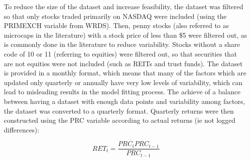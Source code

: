 \documentclass[a4paper, table]{article}
\begin{document}

To reduce the size of the dataset and increase feasibility, the dataset was filtered so that only stocks traded primarily on NASDAQ were included (using the PRIMEXCH variable from WRDS). Then, penny stocks (also referred to as microcaps in the literature) with a stock price of less than \$5 were filtered out, as is commonly done in the literature to reduce variability. Stocks without a share code of 10 or 11 (referring to equities) were filtered out, so that securities that are not equities were not included (such as REITs and trust funds). The dataset is provided in a monthly format, which means that many of the factors which are updated only quarterly or annually have very low levels of variability, which can lead to misleading results in the model fitting process. The achieve of a balance between having a dataset with enough data points and variability among factors, the dataset was converted to a quarterly format. Quarterly returns were then constructed using the PRC variable according to actual returns (ie not logged differences):

\begin{equation}
	RET_t = \frac{PRC_t PRC_{t-1}}{PRC_{t-1}}
\end{equation}


\end{document}
